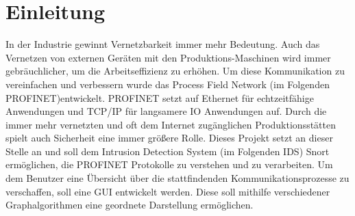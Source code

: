 \chapter*{Einleitung}

In der Industrie gewinnt Vernetzbarkeit immer mehr Bedeutung. Auch das Vernetzen von externen Geräten mit den Produktions-Maschinen wird immer gebräuchlicher, um  die Arbeitseffizienz zu erhöhen. Um diese Kommunikation zu vereinfachen und verbessern wurde das Process Field Network (im Folgenden PROFINET)entwickelt. PROFINET setzt auf Ethernet für echtzeitfähige Anwendungen und TCP/IP für langsamere IO Anwendungen auf.
Durch die immer mehr vernetzten und oft dem Internet zugänglichen Produktionsstätten spielt auch Sicherheit eine immer größere Rolle. Dieses Projekt setzt an dieser Stelle an und soll dem Intrusion Detection System (im Folgenden IDS) Snort ermöglichen, die PROFINET Protokolle zu verstehen und zu verarbeiten. Um dem Benutzer eine Übersicht über die stattfindenden Kommunikationsprozesse zu verschaffen, soll eine GUI entwickelt werden. Diese soll mithilfe verschiedener Graphalgorithmen eine geordnete Darstellung ermöglichen.
